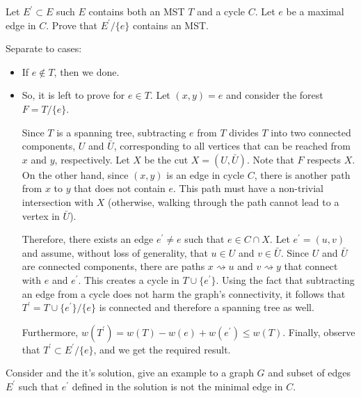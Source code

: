 \begin{problem}
  \label{problem:opkrus}
  Let $E^{\prime} \subset E$ such $E$ contains both an MST $T$ and a cycle $C$. Let $e$ be a maximal edge in $C$. Prove that $E^{\prime}/ \{e\}$ contains an MST.  
\end{problem}

\begin{solution} Separate to cases:
  \begin{itemize}
    \item If $e \notin T$, then we done.
    \item So, it is left to prove for $e \in T$. Let $(x,y) = e$ and consider the forest $F = T/\{e\}$.

Since $T$ is a spanning tree, subtracting $e$ from $T$ divides $T$ into two connected components, $U$ and $\bar{U}$, corresponding to all vertices that can be reached from $x$ and $y$, respectively. Let $X$ be the cut $X = (U, \bar{U})$. Note that $F$ respects $X$. On the other hand, since $(x,y)$ is an edge in cycle $C$, there is another path from $x$ to $y$ that does not contain $e$. This path must have a non-trivial intersection with $X$ (otherwise, walking through the path cannot lead to a vertex in $\bar{U}$).

Therefore, there exists an edge $e^{\prime} \neq e$ such that $e \in C \cap X$. Let $e^{\prime} = (u,v)$ and assume, without loss of generality, that $u \in U$ and $v \in \bar{U}$. Since $U$ and $\bar{U}$ are connected components, there are paths $x \rightsquigarrow u$ and $v \rightsquigarrow y$ that connect with $e$ and $e^{\prime}$. This creates a cycle in $T \cup \{e^{\prime}\}$. Using the fact that subtracting an edge from a cycle does not harm the graph's connectivity, it follows that $T^{\prime} = T \cup \{e^{\prime}\} / \{e\}$ is connected and therefore a spanning tree as well.

Furthermore, $w(T^{\prime}) = w(T) - w(e) + w(e^{\prime}) \leq w(T)$. Finally, observe that $T^{\prime} \subset E^{\prime} / \{e\}$, and we get the required result.
  \end{itemize}
\end{solution}


\begin{problem}
  Consider  and the it's solution, give an example to a graph $G$ and subset of edges $E^{\prime}$ such that $e^{\prime}$ defined in the solution is not the minimal edge in $C$. 
\end{problem}

